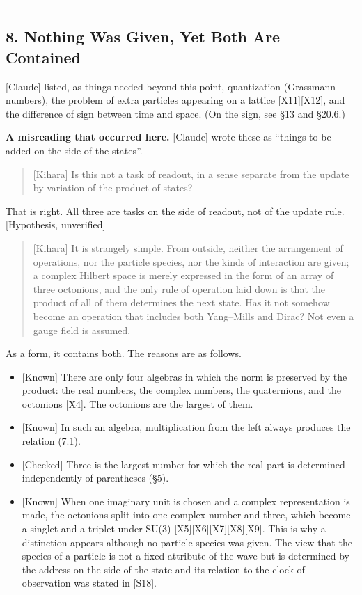 \documentclass[
  a4paper,
]{article}
\providecommand{\tightlist}{%
  \setlength{\itemsep}{0pt}\setlength{\parskip}{0pt}}
\begin{document}
\begin{center}\rule{0.5\linewidth}{0.5pt}\end{center}

\subsection{8. Nothing Was Given, Yet Both Are
Contained}\label{nothing-was-given-yet-both-are-contained}

{[}Claude{]} listed, as things needed beyond this point, quantization
(Grassmann numbers), the problem of extra particles appearing on a
lattice {[}X11{]}{[}X12{]}, and the difference of sign between time and
space. (On the sign, see §13 and §20.6.)

\textbf{A misreading that occurred here.} {[}Claude{]} wrote these as
``things to be added on the side of the states''.

\begin{quote}
{[}Kihara{]} Is this not a task of readout, in a sense separate from the
update by variation of the product of states?
\end{quote}

That is right. All three are tasks on the side of readout, not of the
update rule. {[}Hypothesis, unverified{]}

\begin{quote}
{[}Kihara{]} It is strangely simple. From outside, neither the
arrangement of operations, nor the particle species, nor the kinds of
interaction are given; a complex Hilbert space is merely expressed in
the form of an array of three octonions, and the only rule of operation
laid down is that the product of all of them determines the next state.
Has it not somehow become an operation that includes both Yang--Mills
and Dirac? Not even a gauge field is assumed.
\end{quote}

As a form, it contains both. The reasons are as follows.

\begin{itemize}
\tightlist
\item
  {[}Known{]} There are only four algebras in which the norm is
  preserved by the product: the real numbers, the complex numbers, the
  quaternions, and the octonions {[}X4{]}. The octonions are the largest
  of them.
\item
  {[}Known{]} In such an algebra, multiplication from the left always
  produces the relation (7.1).
\item
  {[}Checked{]} Three is the largest number for which the real part is
  determined independently of parentheses (§5).
\item
  {[}Known{]} When one imaginary unit is chosen and a complex
  representation is made, the octonions split into one complex number
  and three, which become a singlet and a triplet under SU(3)
  {[}X5{]}{[}X6{]}{[}X7{]}{[}X8{]}{[}X9{]}. This is why a distinction
  appears although no particle species was given. The view that the
  species of a particle is not a fixed attribute of the wave but is
  determined by the address on the side of the state and its relation to
  the clock of observation was stated in {[}S18{]}.
\end{itemize}
\end{document}
